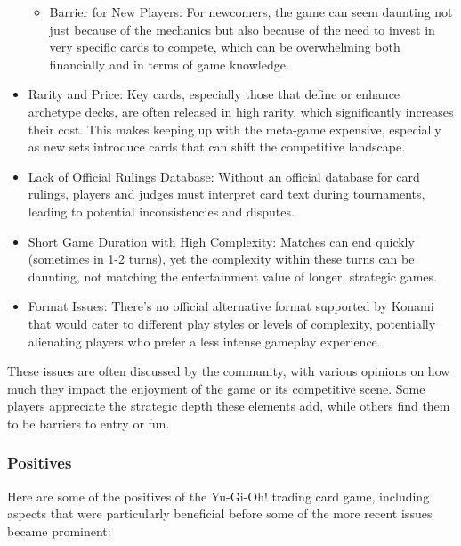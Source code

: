 \begin{itemize}
\begin{itemize}
			  \item Barrier for New Players: For newcomers, the game can seem daunting not just because of the mechanics but also because of the need to invest in very specific cards to compete, which can be overwhelming both financially and in terms of game knowledge.
		  \end{itemize}
	\item Rarity and Price: Key cards, especially those that define or enhance archetype decks, are often released in high rarity, which significantly increases their cost. This makes keeping up with the meta-game expensive, especially as new sets introduce cards that can shift the competitive landscape.
	\item Lack of Official Rulings Database: Without an official database for card rulings, players and judges must interpret card text during tournaments, leading to potential inconsistencies and disputes.
	\item Short Game Duration with High Complexity: Matches can end quickly (sometimes in 1-2 turns), yet the complexity within these turns can be daunting, not matching the entertainment value of longer, strategic games.
	\item Format Issues: There's no official alternative format supported by Konami that would cater to different play styles or levels of complexity, potentially alienating players who prefer a less intense gameplay experience.
\end{itemize}

These issues are often discussed by the community, with various opinions on how much they impact the enjoyment of the game or its competitive scene. Some players appreciate the strategic depth these elements add, while others find them to be barriers to entry or fun.


\subsubsection{Positives}

Here are some of the positives of the Yu-Gi-Oh! trading card game, including aspects that were particularly beneficial before some of the more recent issues became prominent:

